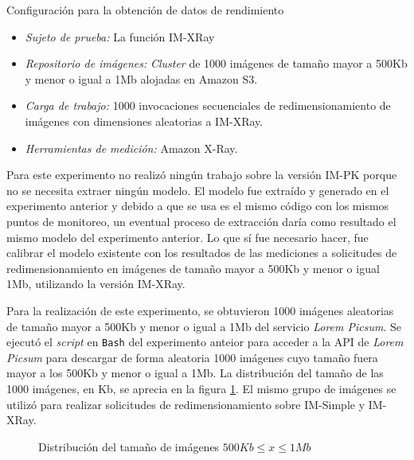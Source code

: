 Configuración para la obtención de datos de rendimiento

\begin{itemize}
    \item \emph{Sujeto de prueba:} La función IM-XRay
    \item \emph{Repositorio de imágenes:} \emph{Cluster} de 1000 imágenes de tamaño mayor a 500Kb y menor o igual a 1Mb alojadas en Amazon S3.     
    \item \emph{Carga de trabajo:} 1000 invocaciones secuenciales de redimensionamiento de imágenes con dimensiones aleatorias a IM-XRay.
    \item \emph{Herramientas de medición:} Amazon X-Ray.
\end{itemize}

Para este experimento no realizó ningún trabajo sobre la versión IM-PK porque no se necesita extraer ningún modelo. El modelo fue extraído y generado en el experimento anterior y debido a que se usa es el mismo código con los mismos puntos de monitoreo, un eventual proceso de extracción daría como resultado el mismo modelo del experimento anterior. Lo que sí fue necesario hacer, fue calibrar el modelo existente con los resultados de las mediciones a solicitudes de redimensionamiento en imágenes de tamaño mayor a 500Kb y menor o igual 1Mb, utilizando la versión IM-XRay. 

Para la realización de este experimento, se obtuvieron 1000 imágenes aleatorias de tamaño mayor a 500Kb y menor o igual a 1Mb del servicio \emph{Lorem Picsum}. Se ejecutó el \emph{script} en \texttt{Bash} del experimento anteior para acceder a la API de \emph{Lorem Picsum} para descargar de forma aleatoria 1000 imágenes cuyo tamaño fuera mayor a los 500Kb y menor o igual a 1Mb. La distribución del tamaño de las 1000 imágenes, en Kb, se aprecia en la figura \ref{fig:distribucion-tamanno-imagenes-hasta-1mb}. El mismo grupo de imágenes se utilizó para realizar solicitudes de redimensionamiento sobre IM-Simple y IM-XRay.

\begin{figure}[h]
\hspace{-2.0cm}
\caption{Distribución del tamaño de imágenes $500Kb \leq x \leq 1Mb$}
\label{fig:distribucion-tamanno-imagenes-hasta-1mb}
\end{figure}

